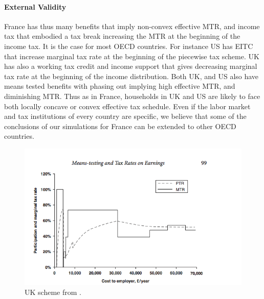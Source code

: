 \paragraph{External Validity}

France has thus many benefits that imply non-convex effective MTR, and income
tax that embodied a tax break increasing the MTR at the beginning of the
income tax. It is the case for most OECD countries. For instance US has EITC
that increase marginal tax rate at the beginning of the piecewise tax scheme.
UK has also a working tax credit and income support that gives decreasing
marginal tax rate at the beginning of the income distribution. Both UK, and US
also have means tested benefits with phasing out implying high effective MTR,
and diminishing MTR. Thus as in France, households in UK and US are likely to
face both locally concave or convex effective tax schedule. Even if the labor
market and tax institutions of every country are specific, we believe that
some of the conclusions of our simulations for France can be extended to other
OECD countries.
\newpage



\begin{figure}[H]
\caption{UK scheme from \citet{brewer2010means} .}
\begin{center}
\includegraphics[width=\textwidth]{saez_brewer_shephard.png}
\end{center}
\end{figure}


